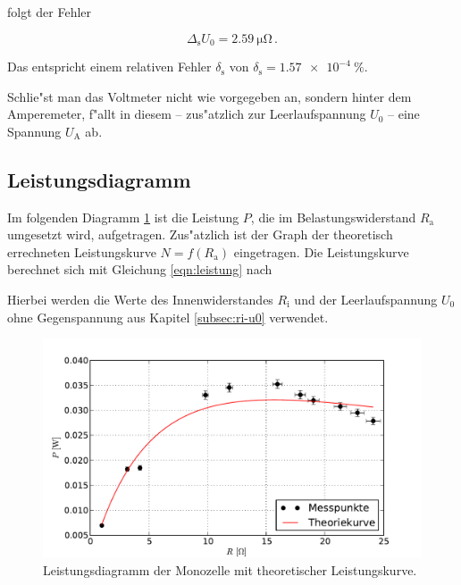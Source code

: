 		folgt der Fehler

		\begin{equation*}
			\Delta_\mathrm{s} U_0 = \SI{2.59}{\micro \ohm} \,.
		\end{equation*}

		Das entspricht einem relativen Fehler $\delta_\mathrm{s}$ von $\delta_\mathrm{s} = \SI{1.57e-4}{\percent}$.

		Schlie"st man das Voltmeter nicht wie vorgegeben an, sondern hinter dem Amperemeter, f"allt in diesem -- zus"atzlich zur Leerlaufspannung $U_0$ -- eine Spannung $U_\mathrm{A}$ ab.

	\subsection{Leistungsdiagramm}
	\label{subsec:leistung}
		Im folgenden Diagramm \ref{fig:graph_monozelle_leistung} ist die Leistung $P$, die im Belastungswiderstand $R_\mathrm{a}$ umgesetzt wird, aufgetragen.
		Zus"atzlich ist der Graph der theoretisch errechneten Leistungskurve $N = f(R_\mathrm{a})$ eingetragen.
		Die Leistungskurve berechnet sich mit Gleichung \eqref{eqn:leistung} nach


		Hierbei werden die Werte des Innenwiderstandes $R_\mathrm{i}$ und der Leerlaufspannung $U_0$ ohne Gegenspannung aus Kapitel \ref{subsec:ri-u0} verwendet.

		\begin{figure}[h]
			\centering
			\includegraphics[width = 15cm]{img/graph_monozelle_leistung.pdf}
			\caption{Leistungsdiagramm der Monozelle mit theoretischer Leistungskurve. \label{fig:graph_monozelle_leistung}}
		\end{figure}